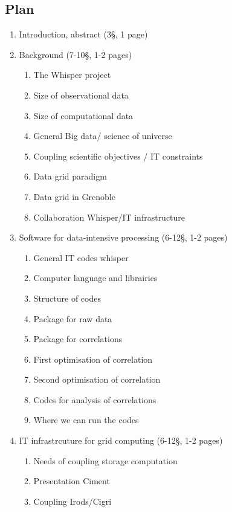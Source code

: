 \documentclass[a4paper, 10pt]{article}
\begin{document}
\begin{multicols}{2}
\section{Plan}
\begin{enumerate}
	\item Introduction, abstract (3\S , 1 page) 
  	\item Background (7-10\S, 1-2 pages)
    \begin{enumerate}
  	  \item The Whisper project
  	  \item Size of observational data
  	  \item Size of computational data
  	  \item General Big data/ science of  universe
  	  \item Coupling scientific objectives / IT constraints
  	  \item Data grid paradigm
  	  \item Data grid in Grenoble
  	  \item Collaboration Whisper/IT infrastructure
  	\end{enumerate}
  	\item Software for data-intensive processing (6-12\S , 1-2 pages)
  	\begin{enumerate}
      \item General IT codes whisper
      \item Computer language and librairies
      \item Structure of codes
      \item Package for raw data
      \item Package for correlations
      \item First optimisation of correlation
      \item Second optimisation of correlation
      \item Codes for analysis of correlations
      \item Where we can run the codes
    \end{enumerate}
  \item IT infrastrcuture for grid computing (6-12\S , 1-2 pages)
    \begin{enumerate}
  	  \item Needs of coupling storage computation
  	  \item Presentation Ciment
  	  \item Coupling Irods/Cigri

\end{enumerate}
\end{enumerate}
\end{multicols}
\end{document}
